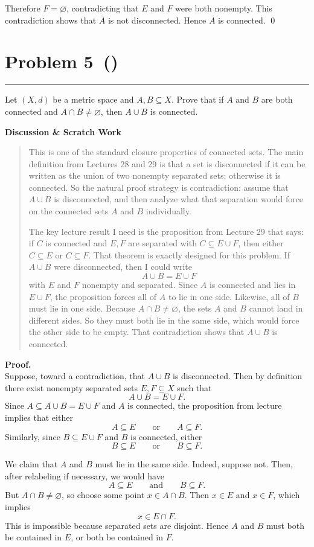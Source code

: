 \documentclass[12pt]{article}
\makeatletter
\newenvironment{scratch}{%
  \par\smallskip
  \noindent\textbf{Discussion \& Scratch Work}\begin{quote}\small
}{%
  \end{quote}\smallskip
}
\newcommand{\problem}[2][]{%
  \def\prob@title{Problem #2\if\relax\detokenize{#1}\relax\else\ (\textit{#1})\fi}%
  \phantomsection%
  \pdfbookmark[1]{\prob@title}{prob#2}%
  \addcontentsline{toc}{section}{\prob@title}%
  \section*{\prob@title}%
  \vspace{-0.25em}\hrule\vspace{0.8em}%
}
\makeatother
\begin{document}
Therefore $F=\varnothing$, contradicting that $E$ and $F$ were both nonempty. This contradiction shows that $\overline{A}$ is not disconnected. Hence $\overline{A}$ is connected.
\qed

\newpage

\problem[]{5}
Let $(X,d)$ be a metric space and $A,B\subseteq X$. Prove that if $A$ and $B$
are both connected and $A\cap B\neq\varnothing$, then $A\cup B$ is connected.

\begin{scratch}
This is one of the standard closure properties of connected sets. The main definition from Lectures 28 and 29 is that a set is disconnected if it can be written as the union of two nonempty separated sets; otherwise it is connected. So the natural proof strategy is contradiction: assume that $A\cup B$ is disconnected, and then analyze what that separation would force on the connected sets $A$ and $B$ individually.

The key lecture result I need is the proposition from Lecture 29 that says: if $C$ is connected and $E,F$ are separated with $C\subseteq E\cup F$, then either $C\subseteq E$ or $C\subseteq F$. That theorem is exactly designed for this problem. If $A\cup B$ were disconnected, then I could write
\[
A\cup B = E\cup F
\]
with $E$ and $F$ nonempty and separated. Since $A$ is connected and lies in $E\cup F$, the proposition forces all of $A$ to lie in one side. Likewise, all of $B$ must lie in one side. Because $A\cap B\neq\varnothing$, the sets $A$ and $B$ cannot land in different sides. So they must both lie in the same side, which would force the other side to be empty. That contradiction shows that $A\cup B$ is connected.
\end{scratch}

\textbf{Proof.}\\
Suppose, toward a contradiction, that $A\cup B$ is disconnected. Then by definition there exist nonempty separated sets $E,F\subseteq X$ such that
\[
A\cup B = E\cup F.
\]
Since $A\subseteq A\cup B = E\cup F$ and $A$ is connected, the proposition from lecture implies that either
\[
A\subseteq E
\qquad\text{or}\qquad
A\subseteq F.
\]
Similarly, since $B\subseteq E\cup F$ and $B$ is connected, either
\[
B\subseteq E
\qquad\text{or}\qquad
B\subseteq F.
\]

We claim that $A$ and $B$ must lie in the same side. Indeed, suppose not. Then, after relabeling if necessary, we would have
\[
A\subseteq E
\qquad\text{and}\qquad
B\subseteq F.
\]
But $A\cap B\neq\varnothing$, so choose some point $x\in A\cap B$. Then $x\in E$ and $x\in F$, which implies
\[
x\in E\cap F.
\]
This is impossible because separated sets are disjoint. Hence $A$ and $B$ must both be contained in $E$, or both be contained in $F$.
\end{document}

